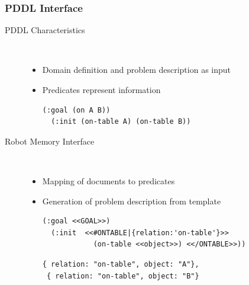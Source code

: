 \begin{frame}[fragile]
  \frametitle{PDDL Interface}
  \begin{description}
  \item[PDDL Characteristics]%
                \hfill \\
    \begin{itemize}
    \item Domain definition and problem description as input %
    \item Predicates represent information
\begin{lstlisting}[style=SmallSlidePDDL,
  framexleftmargin=1pt, xleftmargin=1pt,linewidth=9.5cm,
 morekeywords={}, numbers=none]
  (:goal (on A B))
  (:init (on-table A) (on-table B))
\end{lstlisting}
    \end{itemize}
    \pause
  \item[Robot Memory Interface]%
                \hfill \\
    \begin{itemize}
    \item Mapping of documents to predicates
    \item Generation of problem description from template
\begin{lstlisting}[style=SmallSlidePDDL,
  framexleftmargin=1pt, xleftmargin=1pt,linewidth=9.5cm,
 morekeywords={}, numbers=none]
  (:goal <<GOAL>>)
  (:init  <<#ONTABLE|{relation:'on-table'}>>
            (on-table <<object>>) <</ONTABLE>>))
\end{lstlisting}
\begin{lstlisting}[style=SmallJSON,
  framexleftmargin=0pt, xleftmargin=0pt,linewidth=9.5cm,
 morekeywords={}, numbers=none]
 { relation: "on-table", object: "A"},
 { relation: "on-table", object: "B"}
\end{lstlisting}
    \end{itemize}
  \end{description}
\end{frame}

